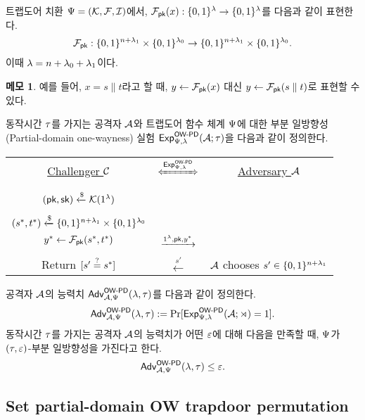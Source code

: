 \documentclass{article}
\theoremstyle{definition}
\newtheorem{memo}{메모}
\begin{document}
트랩도어 치환 $\Psi = (\mathcal{K}, \mathcal{F}, \mathcal{I})$에서, $\mathcal{F}_{\textsf{pk}}(x):\{0, 1\}^{\lambda} \to
\{0, 1\}^{\lambda}$를 다음과 같이 표현한다.
$$
	\mathcal{F}_{\textsf{pk}}: \{0, 1\}^{n + \lambda_1} \times \{0, 1\}^{\lambda_0} \to \{0, 1\}^{n + \lambda_1} \times \{0, 1\}^{\lambda_0}.
$$
이때 $\lambda = n + \lambda_0 + \lambda_1$이다. 
\begin{memo}
	예를 들어, $x = s \parallel t$라고 할 때, $y \gets \mathcal{F}_{\textsf{pk}}(x)$ 대신 $y
	\gets \mathcal{F}_{\textsf{pk}}(s \parallel t)$로 표현할 수 있다.
\end{memo}
동작시간 $\tau$를 가지는 공격자 $\mathcal{A}$와 트랩도어 함수 체계 $\Psi$에 대한 부분
일방향성(Partial-domain one-wayness) 실험 $\textsf{Exp}^{\textsf{OW-PD}}_{\Psi, \lambda}(\mathcal{A};
\tau)$을 다음과 같이 정의한다.

\begin{tcolorbox}[colback=white]
	\centering
	\begin{tabularx}{\linewidth}{CcC}
		\underline{Challenger $\mathcal{C}$} & $\xLeftrightarrow{\Exp^{\owpd}_{\tdsch, \sp}}$ & \underline{Adversary $\mathcal{A}$} \\
		\\
		$(\textsf{pk}, \textsf{sk}) \xleftarrow{\$} \mathcal{K}(1^{\lambda})$ & & \\
		\\
		$(s^*, t^*) \xleftarrow{\$} \{0, 1\}^{n + \lambda_1} \times \{0, 1\}^{\lambda_0}$ \\ $y^* \gets \mathcal{F}_{\textsf{pk}}(s^*, t^*)$ & $\xrightarrow{1^{\lambda}, \textsf{pk}, y^*}$ & \\
		\\
		Return $[s' \overset{?}{=} s^*]$ & $\xleftarrow{s'}$ & $\mathcal{A}$ chooses $s' \in \{0, 1\}^{n + \lambda_1}$ \\
  \end{tabularx}
\end{tcolorbox}

공격자 $\mathcal{A}$의 능력치 $\textsf{Adv}^{\textsf{OW-PD}}_{\mathcal{A}, \Psi}(\lambda, \tau)$를 다음과 같이 정의한다.
$$
	\textsf{Adv}^{\textsf{OW-PD}}_{\mathcal{A}, \Psi}(\lambda, \tau) := \Pr[\textsf{Exp}^{\textsf{OW-PD}}_{\Psi, \lambda}(\mathcal{A}; \rtimes) = 1].
$$
동작시간 $\tau$를 가지는 공격자 $\mathcal{A}$의 능력치가 어떤 $\varepsilon$에 대해 다음을
만족할 때, $\Psi$가 $(\tau, \varepsilon)$-부분 일방향성을 가진다고 한다.
$$
	\textsf{Adv}^{\textsf{OW-PD}}_{\mathcal{A}, \Psi}(\lambda, \tau) \le \varepsilon.
$$

\subsection{Set partial-domain OW trapdoor permutation}
\end{document}
